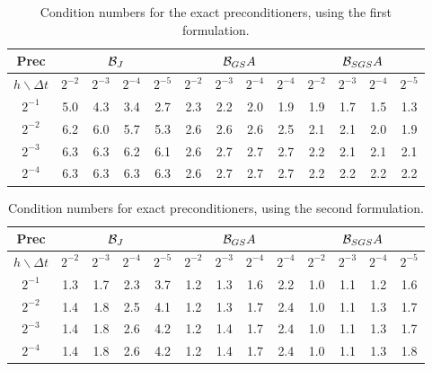 \documentclass{report}
\begin{document}
\begin{table}[h]
\begin{center}
\begin{tabular}{|c||c|c|c|c||c|c|c|c||c|c|c|c||} \hline
Prec & \multicolumn{4}{c|}{$\mathcal{B}_J$}& \multicolumn{4}{c|}{$\mathcal{B}_{GS} A $} &
\multicolumn{4}{c|}{$\mathcal{B}_{SGS} A $}\\ \hline
$h\backslash \Delta t $ &
$2^{-2}$ & $2^{-3}$ & $2^{-4}$ & $2^{-5}$ &
$2^{-2}$ & $2^{-3}$ & $2^{-4}$ & $2^{-4}$ &
$2^{-2}$ & $2^{-3}$ & $2^{-4}$ & $2^{-5}$ \\ \hline \hline
$2^{-1}$ & 5.0 & 4.3 & 3.4 & 2.7 & 2.3 & 2.2 & 2.0 & 1.9 & 1.9 & 1.7 & 1.5 & 1.3 \\
$2^{-2}$ & 6.2 & 6.0 & 5.7 & 5.3 & 2.6 & 2.6 & 2.6 & 2.5 & 2.1 & 2.1 & 2.0 & 1.9 \\
$2^{-3}$ & 6.3 & 6.3 & 6.2 & 6.1 & 2.6 & 2.7 & 2.7 & 2.7 & 2.2 & 2.1 & 2.1 & 2.1 \\
$2^{-4}$ & 6.3 & 6.3 & 6.3 & 6.3 & 2.6 & 2.7 & 2.7 & 2.7 & 2.2 & 2.2 & 2.2 & 2.2 \\
\hline
\end{tabular}
\end{center}
\caption{Condition numbers for the exact preconditioners, using the
first formulation.}
\label{first:exact}
\end{table}

\begin{table}[h]
\begin{center}
\begin{tabular}{|c||c|c|c|c||c|c|c|c||c|c|c|c||} \hline
Prec & \multicolumn{4}{c|}{$\mathcal{B}_J$}& \multicolumn{4}{c|}{$\mathcal{B}_{GS} A $} &
\multicolumn{4}{c|}{$\mathcal{B}_{SGS} A $}\\ \hline
$h\backslash \Delta t $ &
$2^{-2}$ & $2^{-3}$ & $2^{-4}$ & $2^{-5}$ &
$2^{-2}$ & $2^{-3}$ & $2^{-4}$ & $2^{-4}$ &
$2^{-2}$ & $2^{-3}$ & $2^{-4}$ & $2^{-5}$ \\ \hline \hline
$2^{-1}$ & 1.3 & 1.7 & 2.3 & 3.7 & 1.2 & 1.3 & 1.6 & 2.2 & 1.0 & 1.1 & 1.2 & 1.6 \\
$2^{-2}$ & 1.4 & 1.8 & 2.5 & 4.1 & 1.2 & 1.3 & 1.7 & 2.4 & 1.0 & 1.1 & 1.3 & 1.7 \\
$2^{-3}$ & 1.4 & 1.8 & 2.6 & 4.2 & 1.2 & 1.4 & 1.7 & 2.4 & 1.0 & 1.1 & 1.3 & 1.7 \\
$2^{-4}$ & 1.4 & 1.8 & 2.6 & 4.2 & 1.2 & 1.4 & 1.7 & 2.4 & 1.0 & 1.1 & 1.3 & 1.8 \\
\hline
\end{tabular}
\end{center}
\caption{Condition numbers for exact preconditioners, using the second
formulation.}
\label{second:exact}
\end{table}
\end{document}
